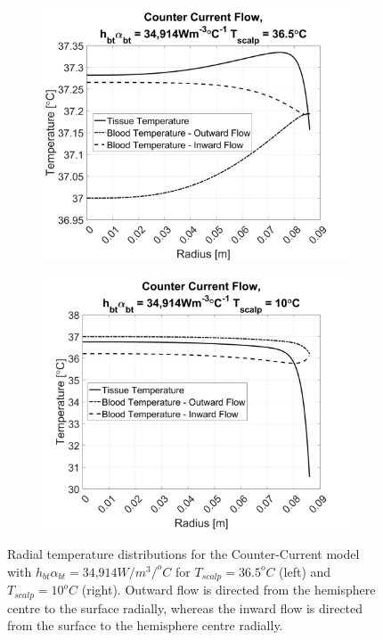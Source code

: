 \documentclass[11pt,english,a4paper,twoside,openright]{report}
\begin{document}
{{{{{{{{\begin{figure}[h]
	\centering
	\begin{subfigure}[b]{0.49\textwidth}
		\includegraphics[width=\textwidth]{1DHemisphere/figure10}
	\end{subfigure}
	\begin{subfigure}[b]{0.49\textwidth}
		\includegraphics[width=\textwidth]{1DHemisphere/figure11}
	\end{subfigure}
	\caption[Radial temperature distributions for the Counter-Current model with $h_{bt}\alpha_{bt} = \text{34,914}W/m^{3}/^{o}C$ for $T_{scalp}=36.5^{o}C$ and $T_{scalp}=10^{o}C$ .]{Radial temperature distributions for the Counter-Current model with $h_{bt}\alpha_{bt} = \text{34,914}W/m^{3}/^{o}C$ for $T_{scalp}=36.5^{o}C$ (left) and $T_{scalp}=10^{o}C$ (right). Outward flow is directed from the hemisphere centre to the surface radially, whereas the inward flow is directed from the surface to the hemisphere centre radially.}
	\label{fig:Results5}
\end{figure}

}}}}}}}}
\end{document}
